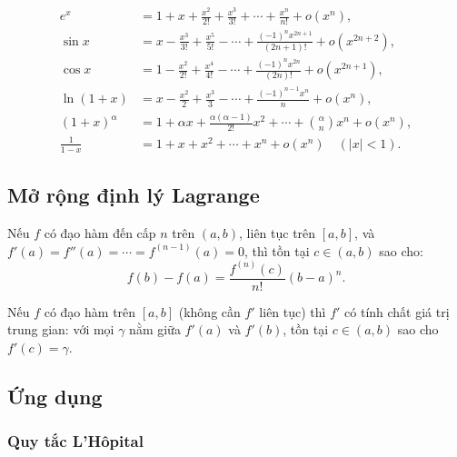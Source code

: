\documentclass[12pt,a4paper]{article}
\begin{document}
\begin{vidu}[title={Khai triển Maclaurin thường gặp}]
  \begin{align*}
    e^x &= 1 + x + \frac{x^2}{2!} + \frac{x^3}{3!} + \cdots + \frac{x^n}{n!} + o(x^n), \\
    \sin x &= x - \frac{x^3}{3!} + \frac{x^5}{5!} - \cdots + \frac{(-1)^n x^{2n+1}}{(2n+1)!} + o(x^{2n+2}), \\
    \cos x &= 1 - \frac{x^2}{2!} + \frac{x^4}{4!} - \cdots + \frac{(-1)^n x^{2n}}{(2n)!} + o(x^{2n+1}), \\
    \ln(1+x) &= x - \frac{x^2}{2} + \frac{x^3}{3} - \cdots + \frac{(-1)^{n-1} x^n}{n} + o(x^n), \\
    (1+x)^\alpha &= 1 + \alpha x + \frac{\alpha(\alpha-1)}{2!}x^2 + \cdots + \binom{\alpha}{n} x^n + o(x^n), \\
    \frac{1}{1-x} &= 1 + x + x^2 + \cdots + x^n + o(x^n) \quad (|x| < 1).
  \end{align*}
\end{vidu}

\subsection{Mở rộng định lý Lagrange}

\begin{dinhly}[title={Định lý Lagrange dạng hữu hạn}]
  Nếu $f$ có đạo hàm đến cấp $n$ trên $(a,b)$, liên tục trên $[a,b]$, và $f'(a) = f''(a) = \cdots = f^{(n-1)}(a) = 0$, thì tồn tại $c \in (a,b)$ sao cho:
  \[
    f(b) - f(a) = \frac{f^{(n)}(c)}{n!}(b - a)^n.
  \]
\end{dinhly}

\begin{dinhly}[title={Darboux (Tính chất giá trị trung gian của đạo hàm)}]
  Nếu $f$ có đạo hàm trên $[a,b]$ (không cần $f'$ liên tục) thì $f'$ có tính chất giá trị trung gian: với mọi $\gamma$ nằm giữa $f'(a)$ và $f'(b)$, tồn tại $c \in (a,b)$ sao cho $f'(c) = \gamma$.
\end{dinhly}

\subsection{Ứng dụng}

\subsubsection{Quy tắc L'Hôpital}
\end{document}
